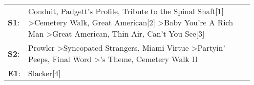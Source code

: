 \begin{supertabular}{p{0.03\textwidth}p{0.92\textwidth}}
 \textbf{S1}:  &  Conduit\textsuperscript{}, \enspace Padgett's Profile\textsuperscript{}, \enspace Tribute to the Spinal Shaft[1]\textsuperscript{} \textgreater \enspace Cemetery Walk\textsuperscript{}, \enspace Great American[2]\textsuperscript{} \textgreater \enspace Baby You're A Rich Man\textsuperscript{} \textgreater \enspace Great American\textsuperscript{}, \enspace Thin Air\textsuperscript{}, \enspace Can't You See[3]\textsuperscript{}  \enspace  \\
 \textbf{S2}:  &                                                                                                                   Prowler\textsuperscript{} \textgreater \enspace Syncopated Strangers\textsuperscript{}, \enspace Miami Virtue\textsuperscript{} \textgreater \enspace Partyin' Peeps\textsuperscript{}, \enspace Final Word\textsuperscript{} \textgreater {}'s Theme\textsuperscript{}, \enspace Cemetery Walk II\textsuperscript{}  \enspace  \\
 \textbf{E1}:  &                                                                                                                                                                                                                                                                                                                                                                                                                    Slacker[4]\textsuperscript{}  \enspace  \\
\end{supertabular}
